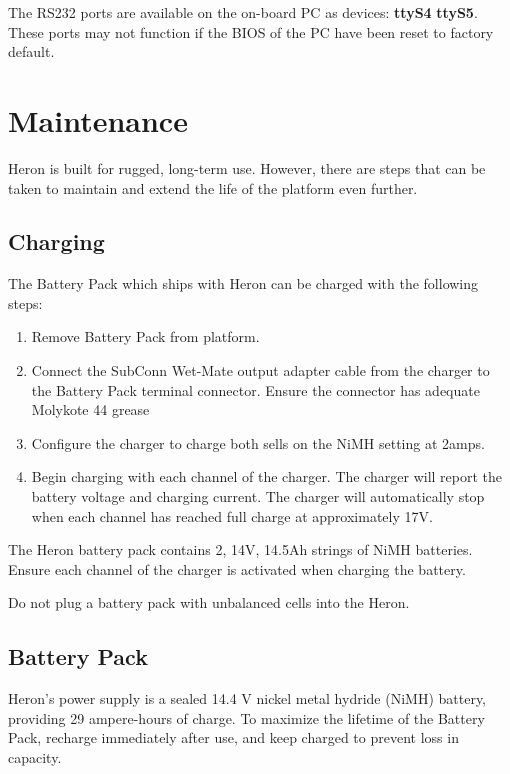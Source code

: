 \documentclass[]{clearpath-latex/clearpath-manual}
\begin{document}
The RS232 ports are available on the on-board PC as devices: \textbf{ttyS4} \textbf{ttyS5}. These ports may not function if the BIOS of the PC have been reset to factory default.

\newpage

\section{Maintenance}
Heron is built for rugged, long-term use. However, there are steps that can be taken to maintain and extend the life of the platform even further.

\subsection{Charging}
The Battery Pack which ships with Heron can be charged with the following steps:

\begin{enumerate}[nolistsep]
	\item Remove Battery Pack from platform.
	\item Connect the SubConn Wet-Mate output adapter cable from the charger to the Battery Pack terminal connector. Ensure the connector has adequate Molykote 44 grease
	\item Configure the charger to charge both sells on the NiMH setting at 2amps.
	\item Begin charging with each channel of the charger. The charger will report the battery voltage and charging current. The charger will automatically stop when each channel has reached full charge at approximately 17V.
\end{enumerate}

\begin{warning}
The Heron battery pack contains 2, 14V, 14.5Ah strings of NiMH batteries. Ensure each channel of the charger is activated when charging the battery.
\end{warning}

\begin{warning}
Do not plug a battery pack with unbalanced cells into the Heron.
\end{warning}

\subsection{Battery Pack}
Heron's power supply is a sealed 14.4 V nickel metal hydride (NiMH) battery, providing 29 ampere-hours of charge. To maximize the lifetime of the Battery Pack, recharge immediately after use, and keep charged to prevent loss in capacity.
\end{document}
